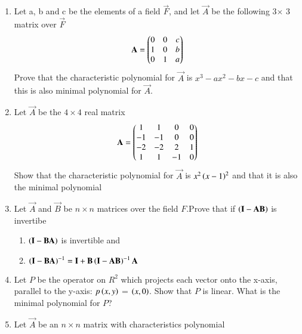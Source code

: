 \renewcommand{\theequation}{\theenumi}
\renewcommand{\thefigure}{\theenumi}
\begin{enumerate}[label=\thesubsection.\arabic*.,ref=\thesubsection.\theenumi]


\item Let a, b and c be the elements of a field $\vec{F}$, and let $\vec{A}$ be the following 3$\times$ 3 matrix over $\vec{F}$
\begin{align}
\mathbf{A} = \begin{pmatrix}0&0&c\\1&0&b\\0&1&a\end{pmatrix}
\label{eq:solutions/6/3/2/Q}
\end{align}
Prove that the characteristic polynomial for $\vec{A}$ is $x^3-ax^2-bx-c$ and that this is also minimal polynomial for $\vec{A}$.
%
\solution

\item %
Let $\Vec{A}$ be the $4\times 4$ real matrix
\begin{align}
    \Vec{A}=\myvec{1&1&0&0\\-1&-1&0&0\\-2&-2&2&1\\1&1&-1&0}
\end{align}
Show that the characteristic polynomial for $\Vec{A}$ is $x^2\left(x-1\right)^2$ and that it is also the minimal polynomial
%
\\
%
\solution

\twocolumn
\item Let $\vec{A}$ and $\vec{B}$ be $n\times n$ matrices over the 
field $F$.Prove that if $\left(\mathbf{I}-\mathbf{A}\mathbf{B}\right)$ is invertibe
\begin{enumerate}
    \item $\left(\mathbf{I}-\mathbf{B}\mathbf{A}\right)$ is invertible and
    \item $\left(\mathbf{I}-\mathbf{B}\mathbf{A}\right)^{-1}=\mathbf{I}+\mathbf{B}\left(\mathbf{I}-\mathbf{A}\mathbf{B}\right)^{-1}\mathbf{A}$
\end{enumerate}
%
\item Let $P$ be the operator on $R^2$ which projects each vector onto the x-axis, parallel to the y-axis: $p\left(x,y\right)$ = $\left(x,0\right)$. Show that $P$ is linear. What is the minimal polynomial for $P$? 
%
\\
\solution

\twocolumn
\item %
Let $\vec{A}$ be an $n\times n$ matrix with characteristics polynomial\\
\begin{align}

\end{align}
\end{enumerate}
